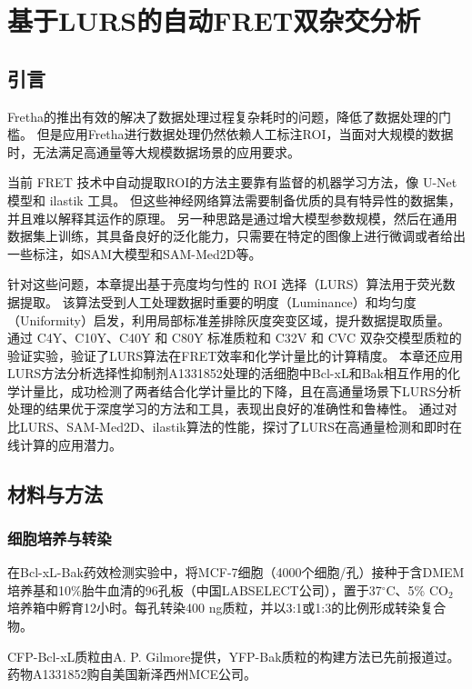\chapter{基于LURS的自动FRET双杂交分析}

\section{引言}
Fretha的推出有效的解决了数据处理过程复杂耗时的问题，降低了数据处理的门槛。
但是应用Fretha进行数据处理仍然依赖人工标注ROI，当面对大规模的数据时，无法满足高通量等大规模数据场景的应用要求。

当前 FRET 技术中自动提取ROI的方法主要靠有监督的机器学习方法，像 U-Net 模型和 ilastik 工具。
但这些神经网络算法需要制备优质的具有特异性的数据集，并且难以解释其运作的原理。
另一种思路是通过增大模型参数规模，然后在通用数据集上训练，其具备良好的泛化能力，只需要在特定的图像上进行微调或者给出一些标注，如SAM大模型和SAM-Med2D等。

针对这些问题，本章提出基于亮度均匀性的 ROI 选择（LURS）算法用于荧光数据提取。
该算法受到人工处理数据时重要的明度（Luminance）和均匀度（Uniformity）启发，利用局部标准差排除灰度突变区域，提升数据提取质量。
通过 C4Y、C10Y、C40Y 和 C80Y 标准质粒和 C32V 和 CVC 双杂交模型质粒的验证实验，验证了LURS算法在FRET效率和化学计量比的计算精度。
本章还应用LURS方法分析选择性抑制剂A1331852处理的活细胞中Bcl-xL和Bak相互作用的化学计量比，成功检测了两者结合化学计量比的下降，且在高通量场景下LURS分析处理的结果优于深度学习的方法和工具，表现出良好的准确性和鲁棒性。
通过对比LURS、SAM-Med2D、ilastik算法的性能，探讨了LURS在高通量检测和即时在线计算的应用潜力。

\section{材料与方法}
\subsection{细胞培养与转染}
在Bcl-xL-Bak药效检测实验中，将MCF-7细胞（4000个细胞/孔）接种于含DMEM培养基和10\%胎牛血清的96孔板（中国LABSELECT公司），置于37$^\circ \text{C}$、5\% $\text{CO}_2$培养箱中孵育12小时。每孔转染400 ng质粒，并以3:1或1:3的比例形成转染复合物。

CFP-Bcl-xL质粒由A. P. Gilmore提供，YFP-Bak质粒的构建方法已先前报道过。
药物A1331852购自美国新泽西州MCE公司。


